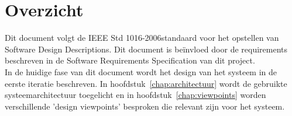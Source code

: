 \section{Overzicht}
Dit document volgt de IEEE Std 1016-2006\texttrademark \space standaard voor het opstellen van Software Design Descriptions. 
Dit document is be\"{i}nvloed door de requirements beschreven in de Software Requirements Specification van dit project.\cite{SRS}\\ 
In de huidige fase van dit document wordt het design van het systeem in de eerste iteratie beschreven. 
In hoofdstuk~\ref{chap:architectuur} wordt de gebruikte systeemarchitectuur toegelicht en in hoofdstuk~\ref{chap:viewpoints} worden verschillende 'design viewpoints' besproken die relevant zijn voor het systeem.